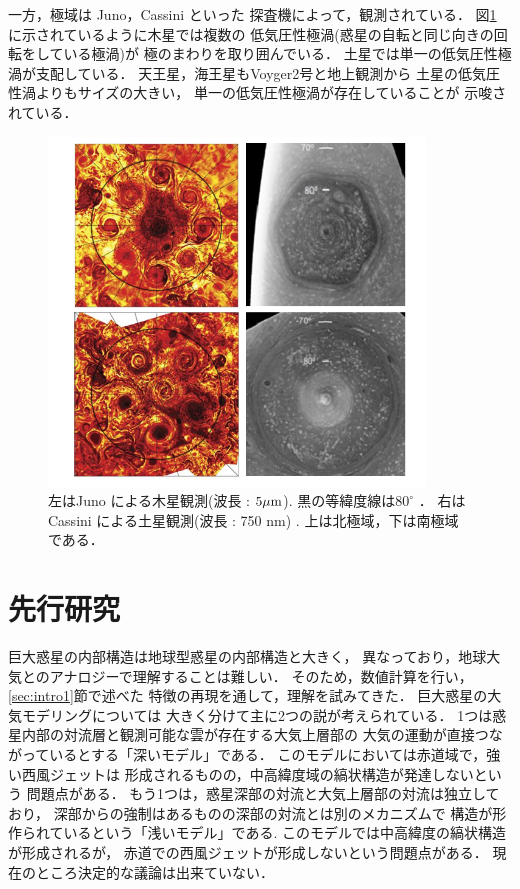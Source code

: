 \documentclass[a4j,12pt,openbib,oneside]{jreport}
\begin{document}
%
一方，極域は
Juno，Cassini といった
探査機によって，観測されている．
図\ref{fig2} に示されているように木星では複数の
低気圧性極渦(惑星の自転と同じ向きの回転をしている極渦)が
極のまわりを取り囲んでいる．
土星では単一の低気圧性極渦が支配している．
天王星，海王星もVoyger2号と地上観測から
土星の低気圧性渦よりもサイズの大きい，
単一の低気圧性極渦が存在していることが
示唆されている．
%
\begin{figure}[t]
  \begin{center}
    \includegraphics[clip,width=10cm]{./fig/intro/fig2.png}
    \caption{
      \footnotesize{左はJuno による木星観測(波長 : $5 \rm{\mu m}$).
黒の等緯度線は$80^\circ$ \citep{Adriani2018}．
右はCassini による土星観測(波長 : 750 nm) \citep{Antuano2015}.
上は北極域，下は南極域である．
      }
    }
    \label{fig2}
  \end{center}
\end{figure}
%
%
\section{先行研究}
\label{sec:intro2}
巨大惑星の内部構造は地球型惑星の内部構造と大きく，
異なっており，地球大気とのアナロジーで理解することは難しい．
そのため，数値計算を行い，\ref{sec:intro1}節で述べた
特徴の再現を通して，理解を試みてきた．
%
巨大惑星の大気モデリングについては
大きく分けて主に2つの説が考えられている．
1つは惑星内部の対流層と観測可能な雲が存在する大気上層部の
大気の運動が直接つながっているとする「深いモデル」である．
このモデルにおいては赤道域で，強い西風ジェットは
形成されるものの，中高緯度域の縞状構造が発達しないという
問題点がある．
%
もう1つは，惑星深部の対流と大気上層部の対流は独立しており，
深部からの強制はあるものの深部の対流とは別のメカニズムで
構造が形作られているという「浅いモデル」である.
このモデルでは中高緯度の縞状構造が形成されるが，
赤道での西風ジェットが形成しないという問題点がある．
%
現在のところ決定的な議論は出来ていない．
\end{document}
